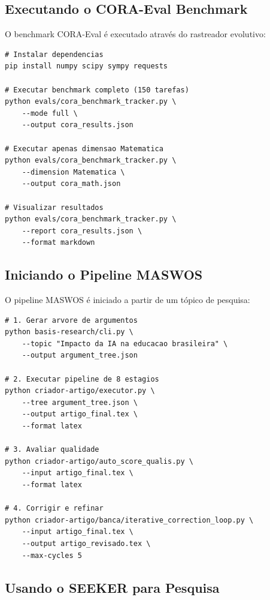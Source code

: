 \subsection{Executando o CORA-Eval Benchmark}

O benchmark CORA-Eval é executado através do rastreador evolutivo:

\begin{lstlisting}[caption={Execucao do CORA-Eval},
label={lst:run-cora}, style=bashstyle]
# Instalar dependencias
pip install numpy scipy sympy requests

# Executar benchmark completo (150 tarefas)
python evals/cora_benchmark_tracker.py \
    --mode full \
    --output cora_results.json

# Executar apenas dimensao Matematica
python evals/cora_benchmark_tracker.py \
    --dimension Matematica \
    --output cora_math.json

# Visualizar resultados
python evals/cora_benchmark_tracker.py \
    --report cora_results.json \
    --format markdown
\end{lstlisting}

\subsection{Iniciando o Pipeline MASWOS}

O pipeline MASWOS é iniciado a partir de um tópico de pesquisa:

\begin{lstlisting}[caption={Inicializacao do MASWOS},
label={lst:run-maswos}, style=bashstyle]
# 1. Gerar arvore de argumentos
python basis-research/cli.py \
    --topic "Impacto da IA na educacao brasileira" \
    --output argument_tree.json

# 2. Executar pipeline de 8 estagios
python criador-artigo/executor.py \
    --tree argument_tree.json \
    --output artigo_final.tex \
    --format latex

# 3. Avaliar qualidade
python criador-artigo/auto_score_qualis.py \
    --input artigo_final.tex \
    --format latex

# 4. Corrigir e refinar
python criador-artigo/banca/iterative_correction_loop.py \
    --input artigo_final.tex \
    --output artigo_revisado.tex \
    --max-cycles 5
\end{lstlisting}

\subsection{Usando o SEEKER para Pesquisa}


